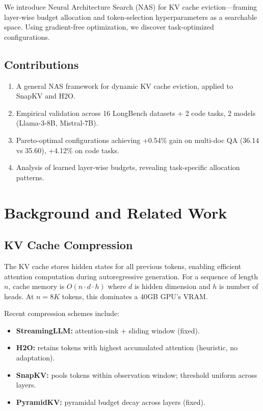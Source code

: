 \documentclass[11pt,a4paper]{article}
\begin{document}
We introduce Neural Architecture Search (NAS) for KV cache eviction—framing layer-wise budget allocation and token-selection hyperparameters as a searchable space. Using gradient-free optimization, we discover task-optimized configurations.

\subsection{Contributions}

\begin{enumerate}
    \item A general NAS framework for dynamic KV cache eviction, applied to SnapKV and H2O.
    \item Empirical validation across 16 LongBench datasets + 2 code tasks, 2 models (Llama-3-8B, Mistral-7B).
    \item Pareto-optimal configurations achieving +0.54\% gain on multi-doc QA (36.14 vs 35.60), +4.12\% on code tasks.
    \item Analysis of learned layer-wise budgets, revealing task-specific allocation patterns.
\end{enumerate}

\section{Background and Related Work}

\subsection{KV Cache Compression}

The KV cache stores hidden states for all previous tokens, enabling efficient attention computation during autoregressive generation. For a sequence of length $n$, cache memory is $O(n \cdot d \cdot h)$ where $d$ is hidden dimension and $h$ is number of heads. At $n=8K$ tokens, this dominates a 40GB GPU's VRAM.

Recent compression schemes include:
\begin{itemize}
    \item \textbf{StreamingLLM:} attention-sink + sliding window (fixed).
    \item \textbf{H2O:} retains tokens with highest accumulated attention (heuristic, no adaptation).
    \item \textbf{SnapKV:} pools tokens within observation window; threshold uniform across layers.
    \item \textbf{PyramidKV:} pyramidal budget decay across layers (fixed).
\end{itemize}
\end{document}
